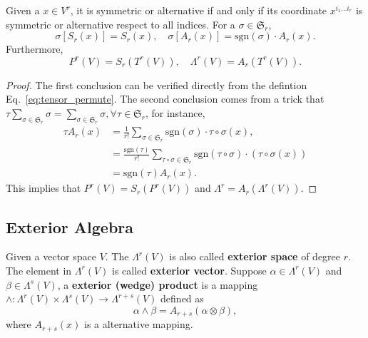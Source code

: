 \begin{theorem}
Given a $x\in V^r$, it is symmetric or alternative if and only if its coordinate $x^{i_1\dots i_r}$ is symmetric or alternative respect to all indices. For a $\sigma\in \mathfrak{S}_r$, 
\begin{equation}
\sigma[S_r(x)]=S_r(x),\quad \sigma[A_r(x)]=\text{sgn}(\sigma)\cdot A_r(x).
\end{equation}
Furthermore, 
\begin{equation}
P^r(V)=S_r(T^r(V)),\quad \Lambda^r(V)=A_r(T^r(V)).
\end{equation} 
\end{theorem}
\begin{proof}
The first conclusion can be verified directly from the defintion Eq.~\ref{eq:tensor_permute}. The second conclusion comes from a trick that $\tau\sum_{\sigma\in\mathfrak{S}_r}\sigma=\sum_{\sigma\in\mathfrak{S}_r}\sigma,\forall \tau\in\mathfrak{S}_r$, for instance, 
\begin{equation*}
\begin{aligned}
\tau A_r(x)&=\frac{1}{r!}\sum_{\sigma\in\mathfrak{S}_r}\text{sgn}(\sigma)\cdot\tau\circ\sigma(x),\\
&=\frac{\text{sgn}(\tau)}{r!}\sum_{\tau\circ\sigma\in\mathfrak{S}_r}\text{sgn}(\tau\circ\sigma)\cdot(\tau\circ\sigma(x))\\
&=\text{sgn}(\tau)A_r(x).
\end{aligned}
\end{equation*}
This implies that $P^r(V)=S_r(P^r(V))$ and $\Lambda^r=A_r(\Lambda^r(V))$.
\end{proof}

\subsection{Exterior Algebra}
\begin{definition}
Given a vector space $V$. The $\Lambda^r(V)$ is also called \textbf{exterior space} of degree $r$. The element in $\Lambda^r(V)$ is called \textbf{exterior vector}. Suppose $\alpha\in\Lambda^r(V)$ and $\beta\in\Lambda^s(V)$, a \textbf{exterior (wedge) product} is a mapping $\wedge:\Lambda^r(V)\times\Lambda^s(V)\to\Lambda^{r+s}(V)$ defined as
\begin{equation}
\alpha\wedge\beta = A_{r+s}(\alpha\otimes\beta),
\end{equation} 
where $A_{r+s}(x)$ is a alternative mapping.
\end{definition}

